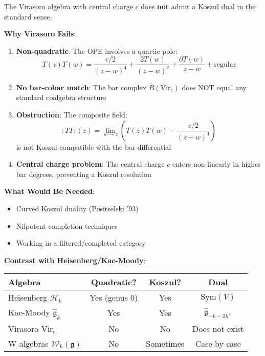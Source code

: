 \begin{remark}
The Virasoro algebra with central charge $c$ does \textbf{not} admit a Koszul dual in the standard sense.

\textbf{Why Virasoro Fails}:
\begin{enumerate}
\item \textbf{Non-quadratic}: The OPE involves a quartic pole:
\begin{equation}
T(z)T(w) = \frac{c/2}{(z-w)^4} + \frac{2T(w)}{(z-w)^2} + \frac{\partial T(w)}{z-w} + \text{regular}
\end{equation}

\item \textbf{No bar-cobar match}: The bar complex $\bar{B}(\text{Vir}_c)$ does NOT equal any standard coalgebra structure

\item \textbf{Obstruction}: The composite field:
\begin{equation}
:TT:(z) = \lim_{w \to z} \left( T(z)T(w) - \frac{c/2}{(z-w)^4} \right)
\end{equation}
is not Koszul-compatible with the bar differential

\item \textbf{Central charge problem}: The central charge $c$ enters non-linearly in higher bar degrees, preventing a Koszul resolution
\end{enumerate}

\textbf{What Would Be Needed}:
\begin{itemize}
\item Curved Koszul duality (Positselski '93)
\item Nilpotent completion techniques
\item Working in a filtered/completed category
\end{itemize}

\textbf{Contrast with Heisenberg/Kac-Moody}:
\begin{center}
\begin{tabular}{|l|c|c|c|}
\hline
\textbf{Algebra} & \textbf{Quadratic?} & \textbf{Koszul?} & \textbf{Dual} \\
\hline
Heisenberg $\mathcal{H}_k$ & Yes (genus 0) & Yes & $\text{Sym}(V)$ \\
Kac-Moody $\widehat{\mathfrak{g}}_k$ & Yes & Yes & $\widehat{\mathfrak{g}}_{-k-2h^\vee}$ \\
Virasoro $\text{Vir}_c$ & No & No & Does not exist \\
W-algebras $\mathcal{W}_k(\mathfrak{g})$ & No & Sometimes & Case-by-case \\
\hline
\end{tabular}
\end{center}
\end{remark}

